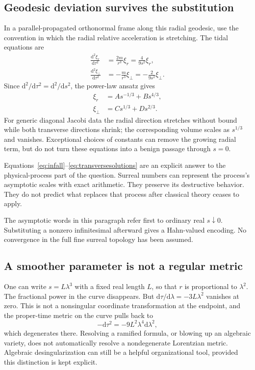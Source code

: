 \documentclass[11pt,a4paper]{article}
\numberwithin{equation}{section}
\theoremstyle{definition}
\theoremstyle{remark}
\newcommand{\dd}{\mathrm d}
\begin{document}
\subsection{Geodesic deviation survives the substitution}
In a parallel-propagated orthonormal frame along this radial geodesic, use the convention in which the radial relative acceleration is stretching. The tidal equations are
\begin{align}
 \frac{\dd^2\xi_r}{\dd\tau^2}
 &=\frac{2m}{r^3}\xi_r=\frac{4}{9s^2}\xi_r,\label{eq:radialjacobi}\\
 \frac{\dd^2\xi_\perp}{\dd\tau^2}
 &=-\frac{m}{r^3}\xi_\perp=-\frac{2}{9s^2}\xi_\perp.
 \label{eq:transversejacobi}
\end{align}
Since $\dd^2/\dd\tau^2=\dd^2/\dd s^2$, the power-law ansatz gives
\begin{align}
 \xi_r&=A s^{-1/3}+B s^{4/3},\label{eq:radialsolutions}\\
 \xi_\perp&=C s^{1/3}+D s^{2/3}.\label{eq:transversesolutions}
\end{align}
For generic diagonal Jacobi data the radial direction stretches without bound while both transverse directions shrink; the corresponding volume scales as $s^{1/3}$ and vanishes. Exceptional choices of constants can remove the growing radial term, but do not turn these equations into a benign passage through $s=0$.

Equations~\eqref{eq:infall}--\eqref{eq:transversesolutions} are an explicit answer to the physical-process part of the question. Surreal numbers can represent the process's asymptotic scales with exact arithmetic. They preserve its destructive behavior. They do not predict what replaces that process after classical theory ceases to apply.

The asymptotic words in this paragraph refer first to ordinary real $s\downarrow0$. Substituting a nonzero infinitesimal afterward gives a Hahn-valued encoding. No convergence in the full fine surreal topology has been assumed.

\subsection{A smoother parameter is not a regular metric}
One can write $s=L\lambda^3$ with a fixed real length $L$, so that $r$ is proportional to $\lambda^2$. The fractional power in the curve disappears. But $\dd\tau/\dd\lambda=-3L\lambda^2$ vanishes at zero. This is not a nonsingular coordinate transformation at the endpoint, and the proper-time metric on the curve pulls back to
\begin{equation}
 -\dd\tau^2=-9L^2\lambda^4\dd\lambda^2,
\end{equation}
which degenerates there. Resolving a ramified formula, or blowing up an algebraic variety, does not automatically resolve a nondegenerate Lorentzian metric. Algebraic desingularization can still be a helpful organizational tool, provided this distinction is kept explicit.
\end{document}
